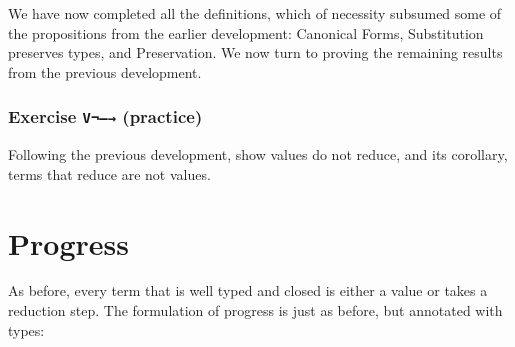 We have now completed all the definitions, which of necessity subsumed
some of the propositions from the earlier development: Canonical Forms,
Substitution preserves types, and Preservation. We now turn to proving
the remaining results from the previous development.

\hypertarget{exercise-v-practice}{%
\subsubsection{\texorpdfstring{Exercise \texttt{V¬—→}
(practice)}{Exercise V¬---→ (practice)}}\label{exercise-v-practice}}

Following the previous development, show values do not reduce, and its
corollary, terms that reduce are not values.

\begin{fence}
\begin{code}%
\>[0]\<%
\end{code}
\end{fence}

\hypertarget{progress}{%
\section{Progress}\label{progress}}

As before, every term that is well typed and closed is either a value or
takes a reduction step. The formulation of progress is just as before,
but annotated with types:

